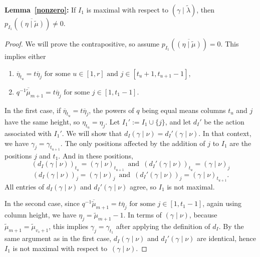 \documentclass[11pt]{article}
\theoremstyle{definition}
\numberwithin{equation}{section}
\newcommand{\gammanu}{{(\gamma \mid \nu)}}
\newcommand{\mutilde}{{\widetilde{\mu}}}
\newcommand{\lambdatilde}{{\widetilde{\lambda}}}
\newcommand{\gammalambdatilde}{{(\gamma \mid \lambdatilde)}}
\newcommand{\etamutilde}{{(\eta \mid \widetilde{\mu})}}
\newcommand{\pIoneevaluated}{p_{I_1}\left(\overline{\etamutilde}\right)}
\newcommand{\dI}{d_I}
\begin{document}
\textbf{Lemma~\ref{nonzero}:} If $I_1$ is maximal with respect to $\gammalambdatilde$, then $\pIoneevaluated \neq 0$.

\begin{proof}
We will prove the contrapositive, so assume $p_{I_1}\left( \overline{\etamutilde}\right) = 0$. This implies either \begin{enumerate} \item $\overline{\eta}_{t_u} = t \overline{\eta}_j \text{ for some } u\in [1,r] \text{ and } j\in [t_u+1,t_{u+1}-1]$,  \item $ q^{-1} \overline{\mutilde}_{m+1} = t \overline{\eta}_j \text{ for some } j \in [1,t_1-1]$.
 \end{enumerate}
 In the first case, if $\overline{\eta}_{t_u} = t\overline{\eta}_j$, the powers of $q$ being equal means columns $t_u$ and $j$ have the same height, so $\eta_{t_u} = \eta_j$. Let $I_1' := I_1 \cup \{j\}$, and let $\dI'$ be the action associated with $I_1'$. We will show that $d_I\gammanu = d_I'\gammanu$. In that context, we have $\gamma_j = \gamma_{t_{u+1}}$. The only positions affected by the addition of $j$ to $I_1$ are the positions $j$ and $t_1$. And in these positions,
 \[ (\dI \gammanu)_{t_u} = \gammanu_{t_{u+1}} \, \text{ and }\,  (\dI' \gammanu)_{t_u} = \gammanu_j\]
 \[ (\dI \gammanu)_{j} = \gammanu_j  \, \text{ and } \, (\dI' \gammanu)_{j} = \gammanu_{t_{u+1}}.\]
 All entries of $d_I\gammanu$ and $d_I'\gammanu$ agree, so $I_1$ is not maximal.
 
 In the second case, since $ q^{-1} \overline{\mutilde}_{m+1} = t \overline{\eta}_j \text{ for some } j \in [1,t_1-1]$, again using column height, we have $\eta_j = \mutilde_{m+1}-1$. In terms of $\gammanu$, because $\mutilde_{m+1} = \mutilde_{v_s+1}$, this implies $\gamma_j = \gamma_{t_1}$ after applying the definition of $\dI$. By the same argument as in the first case, $d_I\gammanu$ and $d_I'\gammanu$ are identical, hence $I_1$ is not maximal with respect to~$\gammanu$.
 \end{proof}
\end{document}
